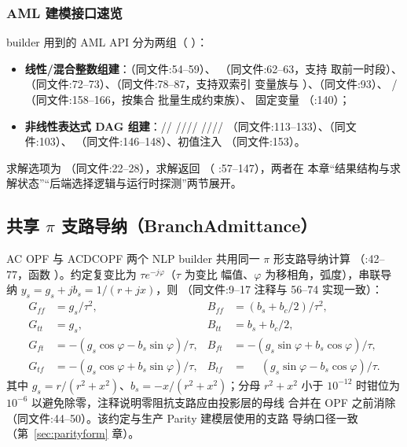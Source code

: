 \subsubsection*{AML 建模接口速览}
builder 用到的 AML API 分为两组（
）：
\begin{itemize}
  \item \textbf{线性/混合整数组建}：（同文件:54--59）、
        （同文件:62--63，支持  取前一时段）、
        （同文件:72--73）、（同文件:78--87，支持双索引
        变量族与 ）、（同文件:93）、
        /（同文件:158--166，按集合
        批量生成约束族）、 固定变量
        （:140）；
  \item \textbf{非线性表达式 DAG 组建}：//
        ////
        ////
        （同文件:113--133）、（同文件:103）、
        （同文件:146--148）、初值注入
        （同文件:153）。
\end{itemize}
求解选项为 （同文件:22--28），求解返回
（
:57--147），两者在
本章“结果结构与求解状态”“后端选择逻辑与运行时探测”两节展开。

\subsection{共享 \texorpdfstring{$\pi$}{π} 支路导纳（BranchAdmittance）}


AC OPF 与 ACDCOPF 两个 NLP builder 共用同一 $\pi$ 形支路导纳计算
（:42--77，函数
）。约定复变比为 $\tau e^{-j\varphi}$（$\tau$ 为变比
幅值、$\varphi$ 为移相角，弧度），串联导纳 $y_s=g_s+jb_s=1/(r+jx)$，则
（同文件:9--17 注释与 56--74 实现一致）：
\begin{align*}
G_{ff} &= g_s/\tau^{2}, & B_{ff} &= (b_s + b_c/2)/\tau^{2},\\
G_{tt} &= g_s,          & B_{tt} &= b_s + b_c/2,\\
G_{ft} &= -(g_s\cos\varphi - b_s\sin\varphi)/\tau, &
B_{ft} &= -(g_s\sin\varphi + b_s\cos\varphi)/\tau,\\
G_{tf} &= -(g_s\cos\varphi + b_s\sin\varphi)/\tau, &
B_{tf} &= \phantom{-}(g_s\sin\varphi - b_s\cos\varphi)/\tau .
\end{align*}
其中 $g_s = r/(r^{2}+x^{2})$、$b_s = -x/(r^{2}+x^{2})$；分母 $r^{2}+x^{2}$ 小于
$10^{-12}$ 时钳位为 $10^{-6}$ 以避免除零，注释说明零阻抗支路应由投影层的母线
合并在 OPF 之前消除（同文件:44--50）。该约定与生产 Parity 建模层使用的支路
导纳口径一致（第~\ref{sec:parityform} 章）。

